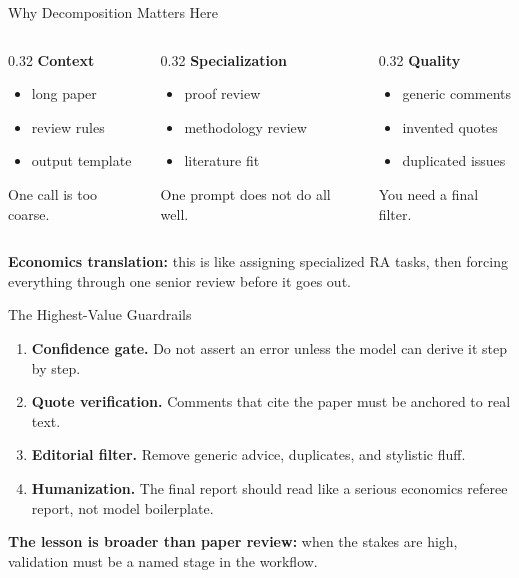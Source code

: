 \documentclass[10pt,english,aspectratio=169]{beamer}
\begin{document}
\begin{frame}{Why Decomposition Matters Here}
\begin{columns}[T]
\begin{column}{0.32\textwidth}
\textbf{Context}
\begin{itemize}
    \item long paper
    \item review rules
    \item output template
\end{itemize}
One call is too coarse.
\end{column}
\begin{column}{0.32\textwidth}
\textbf{Specialization}
\begin{itemize}
    \item proof review
    \item methodology review
    \item literature fit
\end{itemize}
One prompt does not do all well.
\end{column}
\begin{column}{0.32\textwidth}
\textbf{Quality}
\begin{itemize}
    \item generic comments
    \item invented quotes
    \item duplicated issues
\end{itemize}
You need a final filter.
\end{column}
\end{columns}

\vspace{0.3cm}
\textbf{Economics translation:} this is like assigning specialized RA tasks, then forcing everything through one senior review before it goes out.
\end{frame}

\begin{frame}{The Highest-Value Guardrails}
\begin{enumerate}
    \item \textbf{Confidence gate.} Do not assert an error unless the model can derive it step by step.
    \item \textbf{Quote verification.} Comments that cite the paper must be anchored to real text.
    \item \textbf{Editorial filter.} Remove generic advice, duplicates, and stylistic fluff.
    \item \textbf{Humanization.} The final report should read like a serious economics referee report, not model boilerplate.
\end{enumerate}

\vspace{0.3cm}
\textbf{The lesson is broader than paper review:} when the stakes are high, validation must be a named stage in the workflow.
\end{frame}
\end{document}
